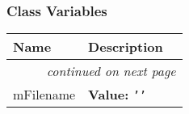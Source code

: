 
  \subsubsection{Class Variables}

    \vspace{-1cm}
\hspace{\varindent}\begin{longtable}{|p{\varnamewidth}|p{\vardescrwidth}|l}
\cline{1-2}
\cline{1-2} \centering \textbf{Name} & \centering \textbf{Description}& \\
\cline{1-2}
\endhead\cline{1-2}\multicolumn{3}{r}{\small\textit{continued on next page}}\\\endfoot\cline{1-2}
\endlastfoot\raggedright m\-F\-i\-l\-e\-n\-a\-m\-e\- & \raggedright \textbf{Value:} 
{\tt \texttt{'}\texttt{}\texttt{'}}&\\
\cline{1-2}
\end{longtable}

